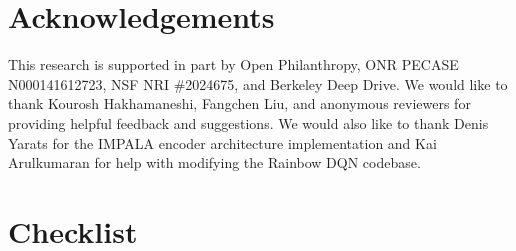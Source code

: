 \documentclass{article}
\begin{document}
\section{Acknowledgements}
This research is supported in part by Open Philanthropy,
ONR PECASE N000141612723, 
NSF NRI \#2024675,
and Berkeley Deep Drive.
We would like to thank Kourosh Hakhamaneshi, Fangchen Liu, and anonymous reviewers for providing helpful feedback and suggestions.
We would also like to thank Denis Yarats for the IMPALA encoder architecture implementation and Kai Arulkumaran for help with modifying the Rainbow DQN codebase.









\section*{Checklist}
\end{document}
